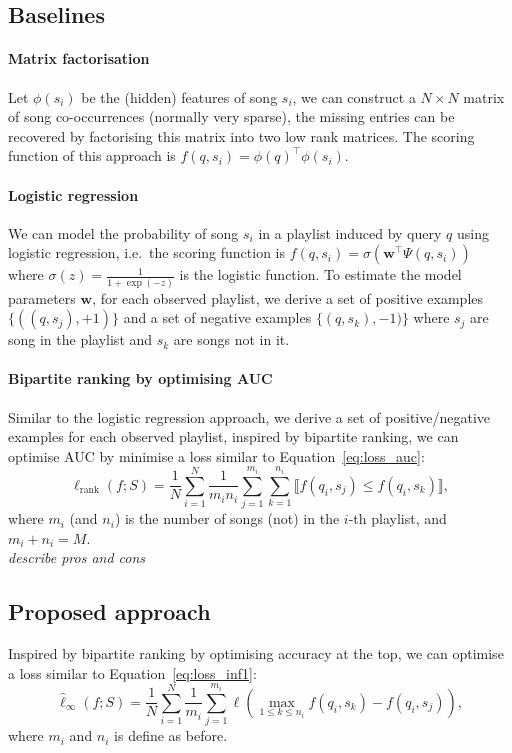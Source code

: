 \documentclass[9pt]{extarticle}
\newcommand{\llb}{\llbracket}
\newcommand{\rrb}{\rrbracket}
\newcommand{\1}{\mathbf{1}}
\newcommand{\w}{\mathbf{w}}
\newcommand{\ie}{i.e.\ }
\begin{document}
\subsection{Baselines}

\paragraph{Matrix factorisation}
Let $\phi(s_i)$ be the (hidden) features of song $s_i$, we can construct a $N \times N$ matrix of song co-occurrences (normally very sparse),
the missing entries can be recovered by factorising this matrix into two low rank matrices.
The scoring function of this approach is $f(q, s_i) = \phi(q)^\top \phi(s_i)$.

\paragraph{Logistic regression}
We can model the probability of song $s_i$ in a playlist induced by query $q$ using logistic regression,
\ie the scoring function is $f(q, s_i) = \sigma(\w^\top \Psi(q, s_i))$ where $\sigma(z) = \frac{1}{1+\exp(-z)}$ is the logistic function.
To estimate the model parameters $\w$, for each observed playlist, we derive a set of positive examples $\{((q, s_j), +1)\}$ and 
a set of negative examples $\{(q, s_k), -1)\}$ where $s_j$ are song in the playlist and $s_k$ are songs not in it.

\paragraph{Bipartite ranking by optimising AUC}
Similar to the logistic regression approach, we derive a set of positive/negative examples for each observed playlist, 
inspired by bipartite ranking, we can optimise AUC by minimise a loss similar to Equation~\ref{eq:loss_auc}:
\begin{equation}
\label{eq:loss_auc_pl}
\ell_\text{rank}(f; S) = \frac{1}{N} \sum_{i=1}^N \frac{1}{m_i n_i} \sum_{j=1}^{m_i} \sum_{k=1}^{n_i} \llb f(q_i, s_j) \le f(q_i, s_k) \rrb,
\end{equation}
where $m_i$ (and $n_i$) is the number of songs (not) in the $i$-th playlist, and $m_i + n_i = M$.
\\ \emph{describe pros and cons}

\subsection{Proposed approach}
Inspired by bipartite ranking by optimising accuracy at the top, we can optimise a loss similar to Equation~\ref{eq:loss_inf1}:
\begin{equation}
\label{eq:loss_inf_pl}
\hat{\ell}_{\infty}(f; S) = \frac{1}{N} \sum_{i=1}^N \frac{1}{m_i} \sum_{j=1}^{m_i} \ell\left( \max_{1 \le k \le n_i} f(q_i, s_k) - f(q_i, s_j) \right),
\end{equation}
where $m_i$ and $n_i$ is define as before.
\end{document}
